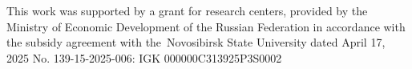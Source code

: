 This work was supported by a grant for research centers, provided by the Ministry of Economic Development of the Russian Federation in accordance with the subsidy agreement with the Novosibirsk State University dated April 17, 2025 No. 139-15-2025-006: IGK 000000C313925P3S0002